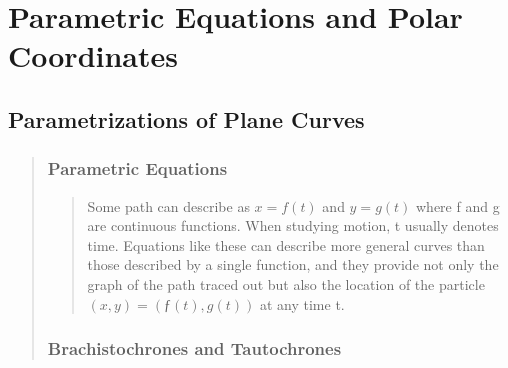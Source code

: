 \documentclass{report}
\begin{document}
\chapter{Parametric Equations and Polar Coordinates }

\setcounter{theorem}{0}

\section{Parametrizations of Plane Curves }
\begin{quote}
	
	\subsection{Parametric Equations}
	\begin{quote}

		Some path can describe as $x = f(t)$ and $y = g(t)$ where f and g are continuous functions.  When studying motion, t usually denotes time. Equations like these can describe more general curves than those described by a single function, and they provide not only the graph of the path traced out but also the location of the particle $(x, y) = (ƒ(t), g(t))$ at any time t.

	\end{quote}

	\subsection{Brachistochrones and Tautochrones}
	\begin{quote}

	\end{quote}


\end{quote}

\end{document}
